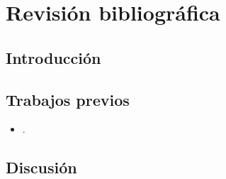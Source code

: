  
\chapter{Revisión bibliográfica}
\section{Introducción}

\section{Trabajos previos}

\begin{itemize}
\item {}.
\end{itemize}

\section{Discusión}
